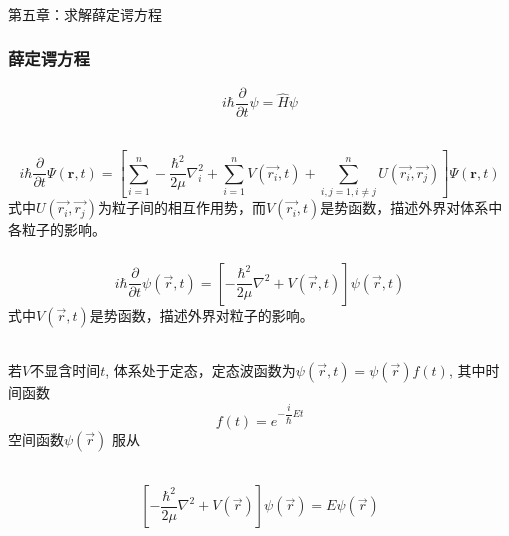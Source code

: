 \begin{frame} [plain]
    \frametitle{}
    \begin{center}
    { {\huge 第五章：求解薛定谔方程 }}
    \end{center}  
    \addtocounter{framenumber}{-1}   
\end{frame}

\begin{frame}
  \frametitle{薛定谔方程}
  \emf[一般形式:]
 \begin{equation}\label{eq:sch}
     i\hbar \frac{\partial }{\partial t} \psi = \hat{H}\psi
  \end{equation}

  ~~\\ 
  \emf[多粒子体系：]
  \begin{equation} \label{eq:msch}
	i\hbar \frac{\partial }{\partial t} \Psi(\mathbf{r},t) =\left[ \sum_{i=1}^{n} -\frac{\hbar^2}{2\mu }\nabla ^2 _i + \sum_{i=1}^{n} V(\vec{r_i},t) + \sum_{i,j=1, i\ne j}^{n}  U(\vec{r_i},\vec{r_j})\right]\Psi(\mathbf{r},t)
 \end{equation}
 式中$U(\vec{r_i},\vec{r_j})$为粒子间的相互作用势，而$V(\vec{r_i},t) $是势函数，描述外界对体系中各粒子的影响。
\end{frame} 

\begin{frame}
  \frametitle{}
  \emf[单粒子体系：]
  \begin{equation}\label{eq:ssch}
    i\hbar \frac{\partial }{\partial t} \psi(\vec{r},t) =\left[ -\frac{\hbar^2}{2\mu }\nabla ^2 + V(\vec{r},t) \right]\psi(\vec{r},t) 
 \end{equation}
 式中$V(\vec{r},t)$是势函数，描述外界对粒子的影响。

~~\\ 
若$V$不显含时间$t$, 体系处于定态，定态波函数为$ \psi(\vec{r},t)  =  \psi(\vec{r}) f(t) $, 其中时间函数
\begin{equation}\label{eq:t}
    f(t) = e^{-\dfrac{i}{\hbar}Et} 
 \end{equation} 
 空间函数$ \psi(\vec{r})$ 服从

~~\\
 \emf[定态薛定谔方程:]
 \begin{equation}\label{eq:dtsch}
 \left[ -\frac{\hbar^2}{2\mu }\nabla ^2 + V(\vec{r}) \right]\psi(\vec{r}) = E\psi(\vec{r})
 \end{equation}
\end{frame} 

